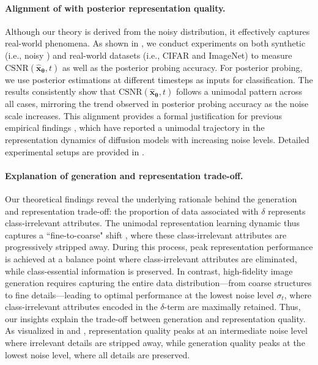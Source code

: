 \paragraph{Alignment of \CSNR\;with posterior representation quality.} Although our theory is derived from the noisy \MoLRG\; distribution, it effectively captures real-world phenomena. As shown in , we conduct experiments on both synthetic (i.e., noisy \MoLRG) and real-world datasets (i.e., CIFAR and ImageNet) to measure $\mathrm{CSNR}(\hat{\bm x}_{\bm \theta},t)$ as well as the posterior probing accuracy. For posterior probing, we use posterior estimations at different timesteps as inputs for classification. The results consistently show that $\mathrm{CSNR}(\hat{\bm x}_{\bm \theta},t)$ follows a unimodal pattern across all cases, mirroring the trend observed in posterior probing accuracy as the noise scale increases. This alignment provides a formal justification for previous empirical findings \citep{xiang2023denoising, baranchuk2021label, tang2023emergent}, which have reported a unimodal trajectory in the representation dynamics of diffusion models with increasing noise levels. Detailed experimental setups are provided in .

\paragraph{Explanation of generation and representation trade-off.}
Our theoretical findings reveal the underlying rationale behind the generation and representation trade-off: the proportion of data associated with $\delta$ represents class-irrelevant attributes. The unimodal representation learning dynamic thus captures a ``fine-to-coarse" shift \citep{choi2022perception, wang2023diffusion}, where these class-irrelevant attributes are progressively stripped away. During this process, peak representation performance is achieved at a balance point where class-irrelevant attributes are eliminated, while class-essential information is preserved. In contrast, high-fidelity image generation requires capturing the entire data distribution—from coarse structures to fine details—leading to optimal performance at the lowest noise level $\sigma_t$, where class-irrelevant attributes encoded in the $\delta$-term are maximally retained. Thus, our insights explain the trade-off between generation and representation quality. As visualized in  and , representation quality peaks at an intermediate noise level where irrelevant details are stripped away, while generation quality peaks at the lowest noise level, where all details are preserved.



